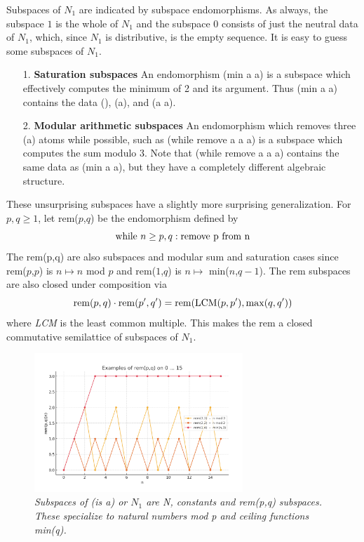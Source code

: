 \documentclass[11pt]{article}
\begin{document}
    Subspaces of $N_1$ are indicated by subspace endomorphisms.  As always, the subspace $1$ is the whole of $N_1$ and the subspace $0$ consists of just the neutral data of $N_1$, which, 
since $N_1$ is distributive, is the empty sequence.  It is easy to guess some subspaces of $N_1$.
\begin{itemize} 
\item [1.] {\bf Saturation subspaces} An endomorphism (min a a) is a subspace which effectively computes the minimum of 2 and its argument.  Thus (min a a) contains the data (), (a), and (a a). 
\item [2.] {\bf Modular arithmetic subspaces} An endomorphism which removes three (a) atoms while possible, such as (while remove a a a) is a subspace which computes the sum modulo 3.  Note 
that (while remove a a a) contains the same data as (min a a), but they have a completely different algebraic structure.  
\end{itemize}
These unsurprising subspaces have a slightly more surprising generalization.  For $p,q\ge 1$, let rem($p$,$q$) be the endomorphism defined by 
\begin{equation}
{\rm while}\ n\ge p,q: {\rm remove\ p\ from\ n}
\end{equation}
The rem(p,q) are also subspaces and modular sum and saturation cases since rem($p$,$p$) is $n\mapsto n$ mod $p$ and rem($1$,$q$) is $n\mapsto$ min($n$,$q-1$).   The rem subspaces are also closed under composition via 
\begin{equation}
{\rm rem}(p,q)\cdot {\rm rem}(p',q') = {\rm rem}({\rm LCM}(p,p'),{\rm max}(q,q'))
\end{equation}
where {\it LCM} is the least common multiple.  This makes the rem a closed commutative semilattice of subspaces of $N_1$.  

\begin{figure}[h]
\centering
\includegraphics[width=0.7\textwidth]{rem.png}
\caption{{\it Subspaces of (is a) or $N_1$ are N, constants and rem(p,q) subspaces.  These specialize to natural numbers mod p and ceiling functions min(q).}}
\end{figure}
\end{document}
